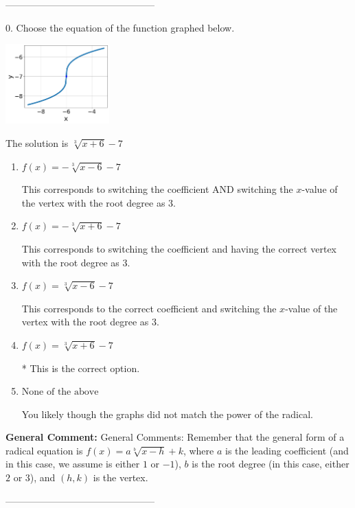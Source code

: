 \documentclass{extbook}[14pt]
\begin{document}
-----------------------------------------------

0. Choose the equation of the function graphed below.
\begin{center} \includegraphics[width=0.3\textwidth]{../Figures/radicalGraphToEquationB.png} \end{center} 

The solution is $ \sqrt[3]{x + 6} - 7 $ 

\begin{enumerate}[label=\Alph*.] 
\item $ f(x) = - \sqrt[3]{x - 6} - 7 $ 

 This corresponds to switching the coefficient AND switching the $x$-value of the vertex with the root degree as $3$. 
\item $ f(x) = - \sqrt[3]{x + 6} - 7 $ 

 This corresponds to switching the coefficient and having the correct vertex with the root degree as $3$. 
\item $ f(x) = \sqrt[3]{x - 6} - 7 $ 

 This corresponds to the correct coefficient and switching the $x$-value of the vertex with the root degree as $3$. 
\item $ f(x) = \sqrt[3]{x + 6} - 7 $ 

 * This is the correct option. 
\item $ \text{None of the above} $ 

 You likely though the graphs did not match the power of the radical. 
\end{enumerate} 
 
\textbf{General Comment:} General Comments: Remember that the general form of a radical equation is $ f(x) = a \sqrt[b]{x - h} + k$, where $a$ is the leading coefficient (and in this case, we assume is either $1$ or $-1$), $b$ is the root degree (in this case, either $2$ or $3$), and $(h, k)$ is the vertex. 

-----------------------------------------------
\end{document}
